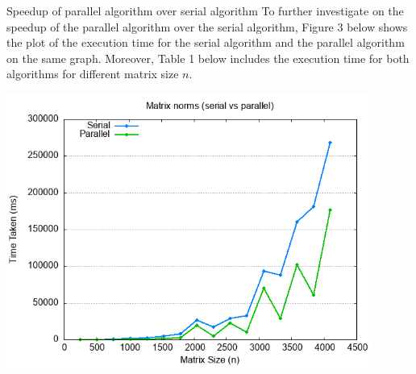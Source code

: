 \documentclass[12pt]{article}
\begin{document}
\begin{section}{Speedup of parallel algorithm over serial algorithm}
 To further investigate on the speedup of the parallel algorithm over the serial algorithm, Figure 3 below shows the plot of the execution time
 for the serial algorithm and the parallel algorithm on the same graph. Moreover, Table 1 below includes the execution time for both algorithms
 for different matrix size $n$.

 \begin{center}
     \includegraphics*[width=12cm]{images/benchmark_combined.png}
 \end{center}


\end{section}
\end{document}
